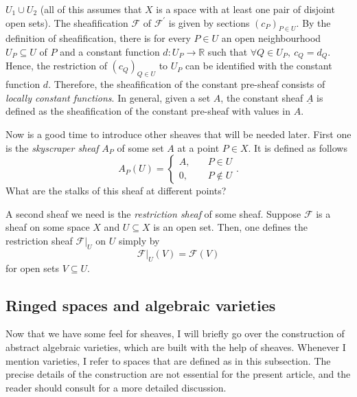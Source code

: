 $U_{1}\cup U_{2}$ (all of this assumes that $X$ is a space with
at least one pair of disjoint open sets). The sheafification $\mathscr{F}$ of
$\mathscr{F}^{\prime}$ is given by sections $(c_{P})_{P\in U}$. By the
definition of sheafification, there is for every $P\in U$ an open
neighbourhood $U_{P}\subseteq U$ of $P$ and a constant function
$d: U_{P}\to\mathbb{R}$ such that $\forall Q\in U_{P},\ c_{Q}=d_{Q}$.
Hence, the restriction of $(c_{Q})_{Q\in U}$ to $U_{P}$ can be identified
with the constant function $d$. Therefore, the sheafification of the constant
pre-sheaf consists of \emph{locally constant functions}. In general, given
a set $A$, the constant sheaf $\underline{A}$ is defined as the sheafification
of the constant pre-sheaf with values in $A$.

Now is a good time to introduce other sheaves that will be needed later.
First one is the \emph{skyscraper sheaf} $A_P$ of some set $A$ at a point $P\in X$.
It is defined as follows
\[
  A_{P}(U)=\begin{cases}
    A, & \quad P\in U \\
    0, & \quad P\not\in U
  \end{cases}.
\]
What are the stalks of this sheaf at different points?

A second sheaf we need is the \emph{restriction sheaf} of some sheaf.
Suppose $\mathscr{F}$ is a sheaf on some space $X$ and $U\subseteq X$ is
an open set. Then, one defines the restriction sheaf $\mathscr{F}\vert_{U}$
on $U$ simply by
\[
  \mathscr{F}\vert_{U}(V)=\mathscr{F}(V)
\]
for open sets $V\subseteq U$.

\subsection{Ringed spaces and algebraic varieties}
Now that we have some feel for sheaves, I will briefly go over the
construction of abstract algebraic varieties, which are built with the help
of sheaves. Whenever I mention varieties, I refer to spaces that are
defined as in this subsection. The precise details of the construction are not
essential for the present article, and the reader should consult
\cite{gathmann} for a more detailed discussion.

